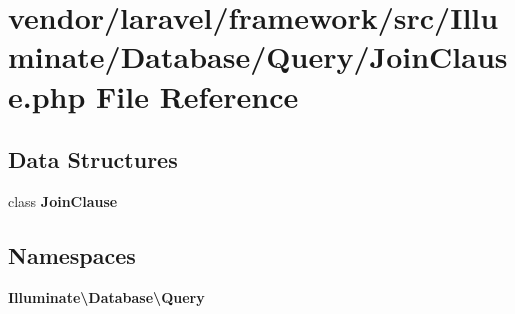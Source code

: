 \section{vendor/laravel/framework/src/\+Illuminate/\+Database/\+Query/\+Join\+Clause.php File Reference}
\label{_join_clause_8php}
\subsection*{Data Structures}
\begin{DoxyCompactItemize}
\item 
class {\bf Join\+Clause}
\end{DoxyCompactItemize}
\subsection*{Namespaces}
\begin{DoxyCompactItemize}
\item 
 {\bf Illuminate\textbackslash{}\+Database\textbackslash{}\+Query}
\end{DoxyCompactItemize}
